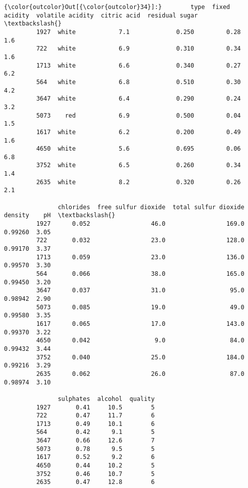 \documentclass[11pt]{article}
\begin{document}
\begin{Verbatim}[commandchars=\\\{\}]
{\color{outcolor}Out[{\color{outcolor}34}]:}        type  fixed acidity  volatile acidity  citric acid  residual sugar  \textbackslash{}
         1927  white            7.1             0.250         0.28             1.6   
         722   white            6.9             0.310         0.34             1.6   
         1713  white            6.6             0.340         0.27             6.2   
         564   white            6.8             0.510         0.30             4.2   
         3647  white            6.4             0.290         0.24             3.2   
         5073    red            6.9             0.500         0.04             1.5   
         1617  white            6.2             0.200         0.49             1.6   
         4650  white            5.6             0.695         0.06             6.8   
         3752  white            6.5             0.260         0.34             1.4   
         2635  white            8.2             0.320         0.26             2.1   
         
               chlorides  free sulfur dioxide  total sulfur dioxide  density    pH  \textbackslash{}
         1927      0.052                 46.0                 169.0  0.99260  3.05   
         722       0.032                 23.0                 128.0  0.99170  3.37   
         1713      0.059                 23.0                 136.0  0.99570  3.30   
         564       0.066                 38.0                 165.0  0.99450  3.20   
         3647      0.037                 31.0                  95.0  0.98942  2.90   
         5073      0.085                 19.0                  49.0  0.99580  3.35   
         1617      0.065                 17.0                 143.0  0.99370  3.22   
         4650      0.042                  9.0                  84.0  0.99432  3.44   
         3752      0.040                 25.0                 184.0  0.99216  3.29   
         2635      0.062                 26.0                  87.0  0.98974  3.10   
         
               sulphates  alcohol  quality  
         1927       0.41     10.5        5  
         722        0.47     11.7        6  
         1713       0.49     10.1        6  
         564        0.42      9.1        5  
         3647       0.66     12.6        7  
         5073       0.78      9.5        5  
         1617       0.52      9.2        6  
         4650       0.44     10.2        5  
         3752       0.46     10.7        5  
         2635       0.47     12.8        6  
\end{Verbatim}
            
\end{document}
